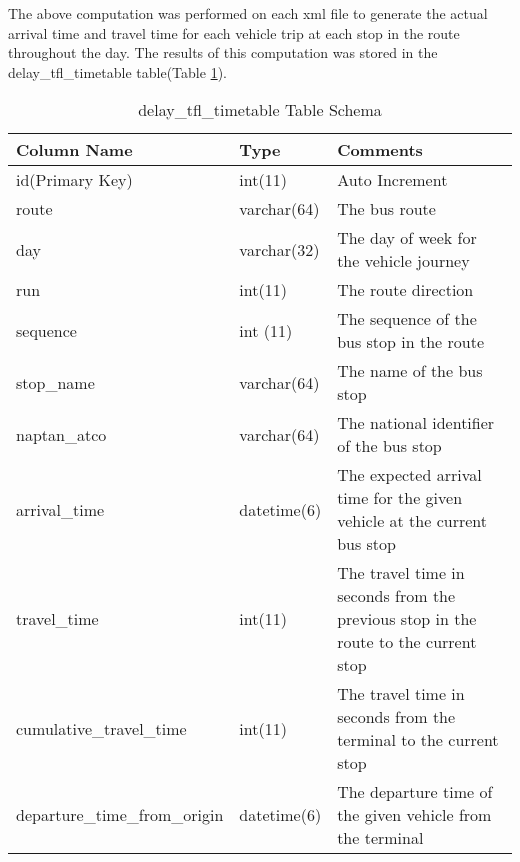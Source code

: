 The above computation was performed on each xml file to generate the actual arrival time and travel time for each vehicle trip at each stop in the route throughout the day. The results of this computation was stored in the delay\_tfl\_timetable table(Table \ref{table:delay_tfl_timetable}).

\begin{table}
\centering
\begin{tabular}{@{}llp{6cm}@{}} \toprule
Column Name & Type & Comments\\ \midrule
id(Primary Key) & int(11)  & Auto Increment\\ [0.4cm]
route & varchar(64) & The bus route \\ [0.4cm]
day & varchar(32) & The day of week for the vehicle journey \\ [0.4cm]
run & int(11) & The route direction \\ [0.4cm]
sequence & int (11) & The sequence of the bus stop in the route \\ [0.4cm]
stop\_name & varchar(64) & The name of the bus stop \\ [0.4cm]
naptan\_atco & varchar(64) & The national identifier of the bus stop \\ [0.4cm]
arrival\_time & datetime(6) & The expected arrival time for the given vehicle at the current bus stop \\ [0.4cm]
travel\_time & int(11) & The travel time in seconds from the previous stop in the route to the current stop \\ [0.4cm]
cumulative\_travel\_time & int(11) & The travel time  in seconds from the terminal to the current stop \\ [0.4cm]
departure\_time\_from\_origin & datetime(6) & The departure time of the given vehicle from the terminal \\
\bottomrule
\end{tabular}
\caption{delay\_tfl\_timetable Table Schema}
\label{table:delay_tfl_timetable}
\end{table}